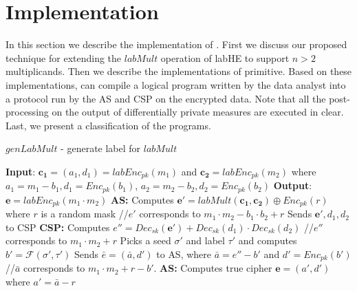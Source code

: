 \section{Implementation}\label{sec:implementation}
In this section we describe the implementation of \system. First we discuss our proposed technique for extending the $labMult$ operation of \textsf{labHE} to support $n > 2$ multiplicands. Then we describe the implementations of \system primitive.  Based on these implementations, \system can compile a logical program written by the data analyst into a protocol run by the \textsf{AS} and \textsf{CSP} on the encrypted data. Note that all the post-processing on the output of differentially private measures are executed in clear. Last, we present a classification of the \system programs.

\begin{algorithm}[b]
\caption{$genLabMult$ - generate label for $labMult$}\label{algo:genlabmult}
\small
\begin{algorithmic}[1]
\STATEx
\textbf{Input}: $\mathbf{c_1}=(a_1,d_1)=labEnc_{pk}(m_1)$ and $\mathbf{c_2}=labEnc_{pk}(m_2)$ 
\STATEx where $a_1= m_1-b_1, d_1=Enc_{pk}(b_1)$, $a_2= m_2-b_2, d_2=Enc_{pk}(b_2)$
\STATEx \textbf{Output}: $\mathbf{e}=labEnc_{pk}(m_1\cdot m_2)$
\STATEx \textbf{\textsf{AS}:} 
\STATE Computes $\textbf{e}'=labMult(\mathbf{c_1,c_2}) \oplus Enc_{pk}(r)$ where $r$ is a random mask 
\STATEx  //$e'$ corresponds to $m_1\cdot m_2-b_1\cdot b_2+r$
\STATE Sends $\mathbf{e'},d_1,d_2$ to \textsf{CSP}
\STATEx \textbf{\textsf{CSP}:}
\STATE Computes $e''= Dec_{sk}(\mathbf{e'}) + Dec_{sk}(d_1)\cdot Dec_{sk}(d_2)$
\STATEx //$e''$ corresponds to $m_1\cdot m_2 + r$ 
\STATE Picks a seed $\sigma'$ and label $\tau'$ and computes $b'=\mathcal{F}(\sigma',\tau')$ 
\STATE Sends $\bar{e}=(\bar{a},d')$ to \textsf{AS}, where $\bar{a} = e''-b'$ and $d' = Enc_{pk}(b')$
\STATEx //$\bar{a}$ corresponds to $m_1\cdot m_2 + r-b'$.
\STATEx \textbf{\textsf{AS}:}
\STATE Computes true cipher $\mathbf{e}=(a',d')$ where $a'=\bar{a}-r$ %
 \end{algorithmic}
\end{algorithm}


